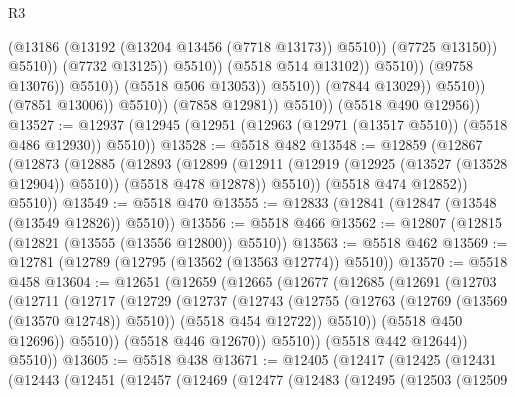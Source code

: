 \begin{lexlean}{R3}
\begin{coremodule}
                                                      (@13186
                                                        (@13192
                                                          (@13204 @13456 (@7718 @13173))
                                                          @5510))
                                                      (@7725 @13150))
                                                    @5510))
                                                (@7732 @13125))
                                              @5510))
                                          (@5518 @514 @13102))
                                        @5510))
                                    (@9758 @13076))
                                  @5510))
                              (@5518 @506 @13053))
                            @5510))
                        (@7844 @13029))
                      @5510))
                  (@7851 @13006))
                @5510))
            (@7858 @12981))
          @5510))
      (@5518 @490 @12956))
@13527 := @12937 (@12945 (@12951 (@12963 (@12971 (@13517 @5510)) (@5518 @486 @12930)) @5510))
@13528 := @5518 @482
@13548 := @12859
    (@12867
      (@12873
        (@12885
          (@12893
            (@12899
              (@12911 (@12919 (@12925 (@13527 (@13528 @12904)) @5510)) (@5518 @478 @12878))
              @5510))
          (@5518 @474 @12852))
        @5510))
@13549 := @5518 @470
@13555 := @12833 (@12841 (@12847 (@13548 (@13549 @12826)) @5510))
@13556 := @5518 @466
@13562 := @12807 (@12815 (@12821 (@13555 (@13556 @12800)) @5510))
@13563 := @5518 @462
@13569 := @12781 (@12789 (@12795 (@13562 (@13563 @12774)) @5510))
@13570 := @5518 @458
@13604 := @12651
    (@12659
      (@12665
        (@12677
          (@12685
            (@12691
              (@12703
                (@12711
                  (@12717
                    (@12729
                      (@12737
                        (@12743
                          (@12755
                            (@12763 (@12769 (@13569 (@13570 @12748)) @5510))
                            (@5518 @454 @12722))
                          @5510))
                      (@5518 @450 @12696))
                    @5510))
                (@5518 @446 @12670))
              @5510))
          (@5518 @442 @12644))
        @5510))
@13605 := @5518 @438
@13671 := @12405
    (@12417
      (@12425
        (@12431
          (@12443
            (@12451
              (@12457
                (@12469
                  (@12477
                    (@12483
                      (@12495
                        (@12503
                          (@12509

\end{coremodule}
\end{lexlean}
